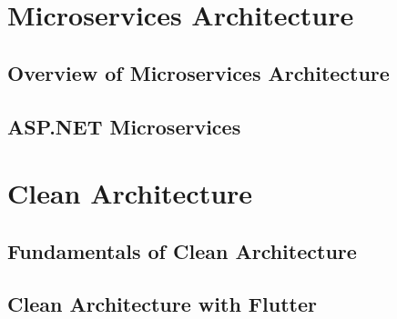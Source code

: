 \section{Microservices Architecture}
\subsection{Overview of Microservices Architecture}
\subsection{ASP.NET Microservices}
\section{Clean Architecture}
\subsection{Fundamentals of Clean Architecture}
\subsection{Clean Architecture with Flutter}
